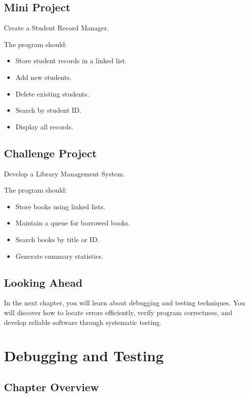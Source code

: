 \documentclass[12pt,openany]{book}
\begin{document}
\section{Mini Project}

Create a Student Record Manager.

The program should:

\begin{itemize}
    \item Store student records in a linked list.
    \item Add new students.
    \item Delete existing students.
    \item Search by student ID.
    \item Display all records.
\end{itemize}

\section{Challenge Project}

Develop a Library Management System.

The program should:

\begin{itemize}
    \item Store books using linked lists.
    \item Maintain a queue for borrowed books.
    \item Search books by title or ID.
    \item Generate summary statistics.
\end{itemize}

\section{Looking Ahead}

In the next chapter, you will learn about debugging and testing techniques. You will discover how to locate errors efficiently, verify program correctness, and develop reliable software through systematic testing.
\chapter{Debugging and Testing}

\section{Chapter Overview}
\end{document}
